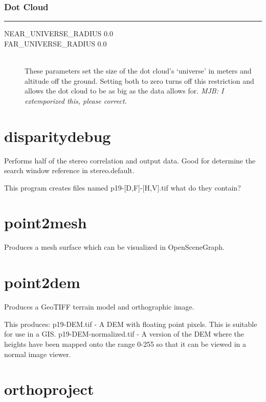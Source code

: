 \subsubsection*{Dot Cloud}
\hrule
\bigskip

\begin{description}
\item[NEAR\_UNIVERSE\_RADIUS 0.0]
\item[FAR\_UNIVERSE\_RADIUS 0.0] \hfill \\
These parameters set the size of the dot cloud's `universe' in meters and altitude off the ground.  Setting both to zero turns off this restriction and allows the dot cloud to be as big as the data allows for. \emph{MJB: I extemporized this, please correct.}

\end{description}

\section{disparitydebug}
\label{disparitydebug}

Performs half of the stereo correlation and output data. Good for
determine the search window reference in stereo.default.

This program creates files named p19-[D,F]-[H,V].tif what do they contain?

\section{point2mesh}
\label{point2mesh}

Produces a mesh surface which can be visualized in OpenSceneGraph.

\section{point2dem}
\label{point2dem}

Produces a GeoTIFF terrain model and orthographic image.

This produces: 
	p19-DEM.tif - A DEM with floating point pixels. This is suitable for use in a GIS.
	p19-DEM-normalized.tif - A version of the DEM where the heights have been mapped onto the range 0-255 so that it can be viewed in a normal image viewer.


\section{orthoproject}

